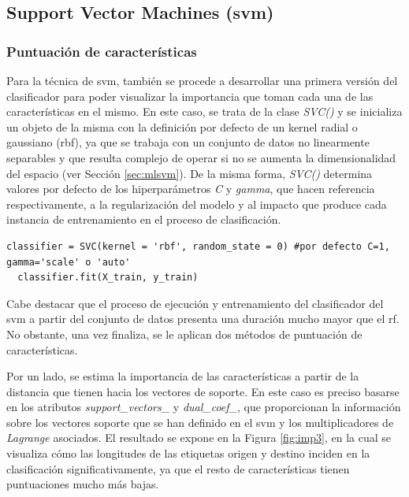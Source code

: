 \subsection{Support Vector Machines (\acrshort{svm})}
\label{sec:svm}

\subsubsection{Puntuación de características}
\label{sec:svm1}

Para la técnica de \gls{svm}, también se procede a desarrollar una primera versión del clasificador para poder visualizar la importancia que toman cada una de las características en el mismo. En este caso, se trata de la clase \textit{SVC()} \cite{svc} y se inicializa un objeto de la misma con la definición por defecto de un kernel radial o gaussiano (\gls{rbf}), ya que se trabaja con un conjunto de datos no linearmente separables y que resulta complejo de operar si no se aumenta la dimensionalidad del espacio (ver Sección \ref{sec:mlsvm}). De la misma forma, \textit{SVC()} determina valores por defecto de los hiperparámetros \textit{C} y \textit{gamma}, que hacen referencia respectivamente, a la regularización del modelo y al impacto que produce cada instancia de entrenamiento en el proceso de clasificación. 

\vspace{3mm}

\begin{lstlisting}[style=Python, caption={Clasificador SVM por defecto}]
  classifier = SVC(kernel = 'rbf', random_state = 0) #por defecto C=1, gamma='scale' o 'auto'
  classifier.fit(X_train, y_train)
\end{lstlisting}
  
\vspace{3mm}

Cabe destacar que el proceso de ejecución y entrenamiento del clasificador del \gls{svm} a partir del conjunto de datos presenta una duración mucho mayor que el \gls{rf}. No obstante, una vez finaliza, se le aplican dos métodos de puntuación de características. 

\vspace{3mm}

Por un lado, se estima la importancia de las características a partir de la distancia que tienen hacia los vectores de soporte. En este caso es preciso basarse en los atributos \textit{support\_vectors\_} y \textit{dual\_coef\_}, que proporcionan la información sobre los vectores soporte que se han definido en el \gls{svm} y los multiplicadores de \textit{Lagrange} asociados. El resultado se expone en la Figura \ref{fig:imp3}, en la cual se visualiza cómo las longitudes de las etiquetas origen y destino inciden en la clasificación significativamente, ya que el resto de características tienen puntuaciones mucho más bajas.

